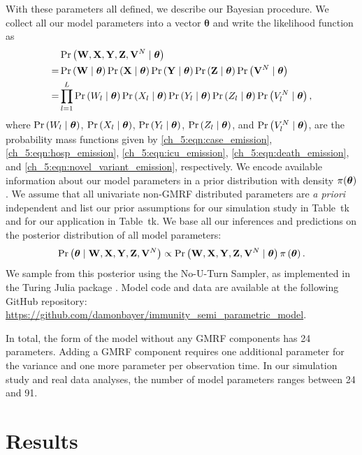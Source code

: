 With these parameters all defined, we describe our Bayesian procedure.
We collect all our model parameters into a vector $\boldsymbol{\theta}$ and write the likelihood function as 
\begin{align*}
& \Pr\left(\mathbf{W}, \mathbf{X}, \mathbf{Y}, \mathbf{Z}, \mathbf{V}^N \mid \boldsymbol{\theta} \right) \\
=& \Pr\left(\mathbf{W} \mid \boldsymbol{\theta} \right) \Pr\left(\mathbf{X} \mid \boldsymbol{\theta} \right) \Pr\left(\mathbf{Y} \mid \boldsymbol{\theta} \right) \Pr\left(\mathbf{Z} \mid \boldsymbol{\theta} \right) \Pr\left(\mathbf{V}^N \mid \boldsymbol{\theta} \right)    \\
=&   \prod_{l=1}^{L} \Pr\left(W_l \mid \boldsymbol{\theta} \right) \Pr\left(X_l \mid \boldsymbol{\theta} \right) \Pr\left(Y_l \mid \boldsymbol{\theta} \right) \Pr\left(Z_l \mid \boldsymbol{\theta} \right) \Pr\left(V^N_l \mid \boldsymbol{\theta} \right) ,
\end{align*}
where \( \Pr\left(W_l \mid \boldsymbol{\theta} \right) \), \( \Pr\left(X_l \mid \boldsymbol{\theta} \right) \), \( \Pr\left(Y_l \mid \boldsymbol{\theta} \right) \), \( \Pr\left(Z_l \mid \boldsymbol{\theta} \right) \), and \( \Pr\left(V^N_l \mid \boldsymbol{\theta} \right) \), are the probability mass functions given by \eqref{ch_5:eqn:case_emission}, \eqref{ch_5:eqn:hosp_emission}, \eqref{ch_5:eqn:icu_emission}, \eqref{ch_5:eqn:death_emission}, and \eqref{ch_5:eqn:novel_variant_emission}, respectively.
We encode available information about our model parameters in a prior distribution with density $\pi(\boldsymbol{\theta})$.
We assume that all univariate non-GMRF distributed parameters are \textit{a priori} independent and list our prior assumptions for our simulation study in Table~tk and for our application in Table~tk.
We base all our inferences and predictions on the posterior distribution of all model parameters:
\begin{equation}
\Pr\left(\boldsymbol{\theta} \mid \mathbf{W}, \mathbf{X}, \mathbf{Y}, \mathbf{Z}, \mathbf{V}^N \right) \propto \Pr\left(\mathbf{W}, \mathbf{X}, \mathbf{Y}, \mathbf{Z}, \mathbf{V}^N \mid \boldsymbol{\theta} \right) \pi \left( \boldsymbol{\theta} \right).
\end{equation}
We sample from this posterior using the No-U-Turn Sampler, \citep{NUTS} as implemented in the Turing Julia package \citep{turing}.
Model code and data are available at the following GitHub repository: \url{https://github.com/damonbayer/immunity_semi_parametric_model}.

In total, the form of the model without any GMRF components has 24 parameters.
Adding a GMRF component requires one additional parameter for the variance and one more parameter per observation time.
In our simulation study and real data analyses, the number of model parameters ranges between 24 and 91.

\section{Results}
\label{ch_5:sec:results}

